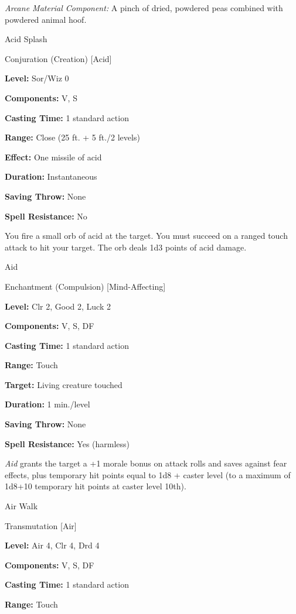 \documentclass{article}
\begin{document}
\textit{Arcane Material Component:} A pinch of dried, powdered peas combined with 
powdered animal hoof.

\vspace{12pt}
Acid Splash

Conjuration (Creation) [Acid]

\textbf{Level:} Sor/Wiz 0

\textbf{Components:} V, S

\textbf{Casting Time:} 1 standard action

\textbf{Range:} Close (25 ft. + 5 ft./2 levels)

\textbf{Effect:} One missile of acid

\textbf{Duration:} Instantaneous

\textbf{Saving Throw:} None

\textbf{Spell Resistance:} No

You fire a small orb of acid at the target. You must succeed on a ranged touch 
attack to hit your target. The orb deals 1d3 points of acid damage.

\vspace{12pt}
Aid

Enchantment (Compulsion) [Mind-Affecting]

\textbf{Level:} Clr 2, Good 2, Luck 2

\textbf{Components:} V, S, DF

\textbf{Casting Time:} 1 standard action

\textbf{Range:} Touch

\textbf{Target:} Living creature touched

\textbf{Duration:} 1 min./level

\textbf{Saving Throw:} None

\textbf{Spell Resistance:} Yes (harmless)

\textit{Aid }grants the target a +1 morale bonus on attack rolls and saves against 
fear effects, plus temporary hit points equal to 1d8 + caster level (to a maximum 
of 1d8+10 temporary hit points at caster level 10th).

\vspace{12pt}
Air Walk

Transmutation [Air]

\textbf{Level:} Air 4, Clr 4, Drd 4

\textbf{Components:} V, S, DF

\textbf{Casting Time:} 1 standard action

\textbf{Range:} Touch
\end{document}
